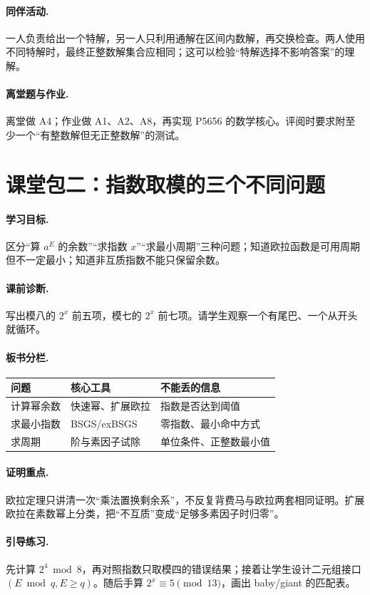 \paragraph{同伴活动.} 一人负责给出一个特解，另一人只利用通解在区间内数解，再交换检查。两人使用不同特解时，最终正整数解集合应相同；这可以检验“特解选择不影响答案”的理解。
\paragraph{离堂题与作业.} 离堂做 A4；作业做 A1、A2、A8，再实现 P5656 的数学核心。评阅时要求附至少一个“有整数解但无正整数解”的测试。

\section{课堂包二：指数取模的三个不同问题}
\paragraph{学习目标.} 区分“算 $a^E$ 的余数”“求指数 $x$”“求最小周期”三种问题；知道欧拉函数是可用周期但不一定最小；知道非互质指数不能只保留余数。
\paragraph{课前诊断.} 写出模八的 $2^x$ 前五项，模七的 $2^x$ 前七项。请学生观察一个有尾巴、一个从开头就循环。
\paragraph{板书分栏.}
\begin{center}
\begin{tabular}{lll}
\toprule
问题 & 核心工具 & 不能丢的信息\\\midrule
计算幂余数 & 快速幂、扩展欧拉 & 指数是否达到阈值\\
求最小指数 & BSGS/exBSGS & 零指数、最小命中方式\\
求周期 & 阶与素因子试除 & 单位条件、正整数最小值\\\bottomrule
\end{tabular}
\end{center}
\paragraph{证明重点.} 欧拉定理只讲清一次“乘法置换剩余系”，不反复背费马与欧拉两套相同证明。扩展欧拉在素数幂上分类，把“不互质”变成“足够多素因子时归零”。
\paragraph{引导练习.} 先计算 $2^4\bmod8$，再对照指数只取模四的错误结果；接着让学生设计二元组接口 $(E\bmod q,E\ge q)$。随后手算 $2^x\equiv5\pmod{13}$，画出 baby/giant 的匹配表。
